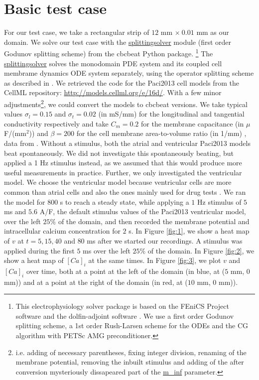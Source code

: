 \documentclass[12pt,a4paper]{article}
\begin{document}
\section{Basic test case} \label{Basic test case}
For our test case, we take a rectangular strip of $12$ mm $\times\: 0.01$ mm as our domain. We solve our test case with the \url{splittingsolver} module (first order Godunov splitting scheme) from the cbcbeat Python package. \cite{cbcbeat}\footnote{This electrophysiology solver package is based on the FEniCS Project software \cite{fenics} and the dolfin-adjoint software \cite{dolfin-adjoint}. We use a first order Godunov splitting scheme, a 1st order Rush-Larsen scheme for the ODEs and the CG algorithm with PETSc AMG preconditioner.} The \url{splittingsolver} solves the monodomain PDE system and its coupled cell membrame dynamics ODE system separately, using the operator splitting scheme as described in \cite{Sundnes}. We retrieved the code for the Paci2013 cell models from the CellML repository: \url{http://models.cellml.org/e/16d/}. With a few minor adjustments\footnote{i.e. adding of necessary parentheses, fixing integer division, renaming of the membrane potential, removing the inbuilt stimulus and adding of the after conversion mysteriously dissapeared part of the \url{m_inf} parameter.}, we could convert the models to cbcbeat versions.  We take typical values $\sigma_l=0.15$ and $\sigma_t=0.02$ (in mS/mm) for the longitudinal and tangential conductivity respectively and take $C_m=0.2$ for the membrane capacitance (in $\mu$F/(mm$^2$)) and $\beta=200$ for the cell membrane area-to-volume ratio (in 1/mm) \cite{Roth}, data from \cite{Plonsey1882, Plonsey1984}. Without a stimulus, both the atrial and ventricular Paci2013 models beat spontaneously. We did not investigate this spontaneously beating, but applied a 1 Hz stimulus instead, as we assumed that this would produce more useful measurements in practice. Further, we only investigated the ventricular model. We choose the ventricular model because ventricular cells are more common than atrial cells and also the ones mainly used for drug tests \cite{Paci2015}.
We ran the model for 800 s to reach a steady state, while applying a $1$ Hz stimulus of $5$ ms and $5.6$ A/F, the default stimulus values of the Paci2013 ventricular model, over the left $25\%$ of the domain, and then recorded the membrane potential and intracellular calcium concentration for $2$ s. In Figure \ref{fig:1}, we show a heat map of $v$ at $t=5, 15, 40$ and $80$ ms after we started our recordings. A stimulus was applied during the first $5$ ms over the left $25\%$ of the domain. In Figure \ref{fig:2}, we show a heat map of $[Ca]_i$ at the same times. In Figure \ref{fig:3}, we plot $v$ and $[Ca]_i$ over time, both at a point at the left of the domain (in blue, at ($5$ mm, $0$ mm)) and at a point at the right of the domain (in red, at ($10$ mm, $0$ mm)).
\end{document}
